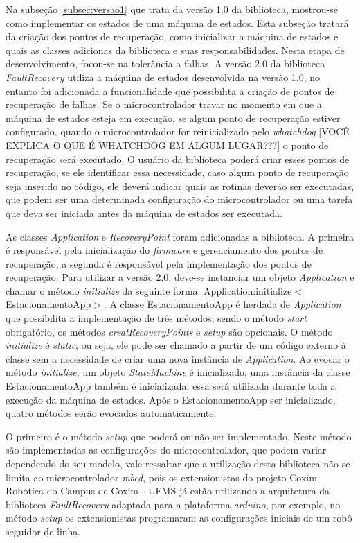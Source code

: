 Na subseção \ref{subsec:versao1} que trata da versão 1.0 da biblioteca, mostrou-se como implementar os estados de uma máquina de estados. Esta subseção tratará da criação dos pontos de recuperação, como inicializar a máquina de estados e quais as classes adicionas da biblioteca e suas responsabilidades. Nesta etapa de desenvolvimento, focou-se na tolerância a falhas. A versão 2.0 da biblioteca \textit{FaultRecovery} utiliza a máquina de estados desenvolvida na versão 1.0, no entanto foi adicionada a funcionalidade que possibilita a criação de pontos de recuperação de falhas. Se o microcontrolador travar no momento em que a máquina de estados esteja em execução, se algum ponto de recuperação estiver configurado, quando o microcontrolador for reinicializado pelo \textit{whatchdog} [VOCÊ EXPLICA O QUE É WHATCHDOG EM ALGUM LUGAR???] o ponto de recuperação será executado. O usuário da biblioteca poderá criar esses pontos de recuperação, se ele identificar essa necessidade, caso algum ponto de recuperação seja inserido no código, ele deverá indicar quais as rotinas deverão ser executadas, que podem ser uma determinada configuração do microcontrolador ou uma tarefa que deva ser iniciada antes da máquina de estados ser executada. 

As classes \textit{Application} e \textit{RecoveryPoint} foram adicionadas a biblioteca. A primeira é responsável pela inicialização do \textit{firmware} e gerenciamento dos pontos de recuperação, a segunda é responsável pela implementação dos pontos de recuperação. Para utilizar a versão 2.0, deve-se instanciar um objeto \textit{Application} e chamar o método \textit{initialize} da seguinte forma: Application:initialize$<$EstacionamentoApp$>$. A classe EstacionamentoApp é herdada de \textit{Application} que possibilita a implementação de três métodos, sendo o método \textit{start} obrigatório, os métodos \textit{creatRecoveryPoints} e \textit{setup} são opcionais. O método \textit{initialize} é \textit{static}, ou seja, ele pode ser chamado a partir de um código externo à classe sem a necessidade de criar uma nova instância de \textit{Application}. Ao evocar o método \textit{initialize}, um objeto \textit{StateMachine} é inicializado, uma instância da classe EstacionamentoApp também é inicializada, essa será utilizada durante toda a execução da máquina de estados. Após o EstacionamentoApp ser inicializado, quatro métodos serão evocados automaticamente. 

O primeiro é o método \textit{setup} que poderá ou não ser implementado. Neste método são implementadas as configurações do microcontrolador, que podem variar dependendo do seu modelo, vale ressaltar que a utilização desta biblioteca não se limita ao microcontrolador \textit{mbed}, pois os extensionistas do projeto Coxim Robótica do Campus de Coxim - UFMS já estão utilizando a arquitetura da biblioteca \textit{FaultRecovery} adaptada para a plataforma \textit{arduino}, por exemplo, no método \textit{setup} os extensionistas programaram as configurações iniciais de um robô seguidor de linha.


